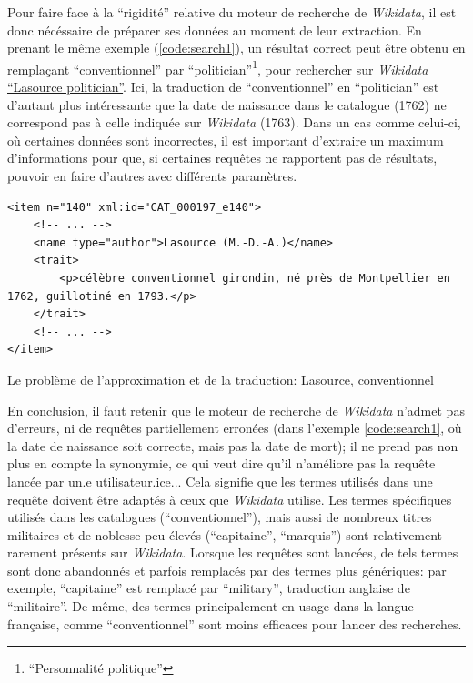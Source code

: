 \documentclass[a4paper, 12pt, twoside]{book}
\newenvironment{code}{\captionsetup{type=listing}}{}
\newcommand{\wkd}{\textit{Wikidata}}
\begin{document}
Pour faire face à la \enquote{rigidité} relative du moteur de recherche de \wkd{}, il est donc nécéssaire de préparer ses données au moment de leur extraction. En prenant le même exemple (\ref{code:search1}), un résultat correct peut être obtenu en remplaçant \enquote{conventionnel} par \enquote{politician}\footnote{\enquote{Personnalité politique}}, pour rechercher sur \wkd{} \href{https://www.wikidata.org/w/index.php?search=lasource+politician&search=lasource+politician&title=Special%3ASearch&go=Go&ns0=1&ns120=1}{\enquote{Lasource politician}}. Ici, la traduction de \enquote{conventionnel} en \enquote{politician} est d'autant plus intéressante que la date de naissance dans le catalogue (1762) ne correspond pas à celle indiquée sur \wkd{} (1763). Dans un cas comme celui-ci, où certaines données sont incorrectes, il est important d'extraire un maximum d'informations pour que, si certaines requêtes ne rapportent pas de résultats, pouvoir en faire d'autres avec différents paramètres.

\begin{code}
	\begin{verbatim}
<item n="140" xml:id="CAT_000197_e140">
	<!-- ... -->
	<name type="author">Lasource (M.-D.-A.)</name>
	<trait>
		<p>célèbre conventionnel girondin, né près de Montpellier en 1762, guillotiné en 1793.</p>
	</trait>
	<!-- ... -->
</item>	
	\end{verbatim}
	\label{code:search1}
	\caption{Le problème de l'approximation et de la traduction: Lasource, conventionnel}
\end{code}

En conclusion, il faut retenir que le moteur de recherche de \wkd{} n'admet pas d'erreurs, ni de requêtes partiellement erronées (dans l'exemple \ref{code:search1}, où la date de naissance soit correcte, mais pas la date de mort); il ne prend pas non plus en compte la synonymie, ce qui veut dire qu'il n'améliore pas la requête lancée par un.e utilisateur.ice... Cela signifie que les termes utilisés dans une requête doivent être adaptés à ceux que \wkd{} utilise. Les termes spécifiques utilisés dans les catalogues (\enquote{conventionnel}), mais aussi de nombreux titres militaires et de noblesse peu élevés (\enquote{capitaine}, \enquote{marquis}) sont relativement rarement présents sur \wkd{}. Lorsque les requêtes sont lancées, de tels termes sont donc abandonnés et parfois remplacés par des termes plus génériques: par exemple, \enquote{capitaine} est remplacé par \enquote{military}, traduction anglaise de \enquote{militaire}. De même, des termes principalement en usage dans la langue française, comme \enquote{conventionnel} sont moins efficaces pour lancer des recherches.
\end{document}
